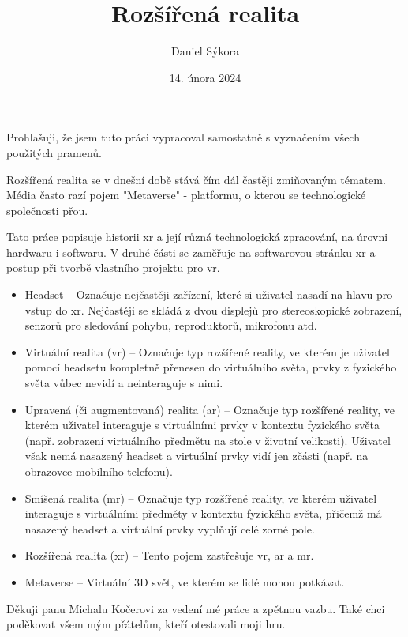 \documentclass[12pt]{report}
\author{Daniel Sýkora}
\title{Rozšířená realita}
\date{14. února 2024}
\begin{document}
\mytitlepage
\prohlaseni
{
	Prohlašuji, že jsem tuto práci vypracoval samostatně s vyznačením všech použitých pramenů.
}
\abstrakt
{ %
	Rozšířená realita se v dnešní době stává čím dál častěji zmiňovaným tématem. Média často razí pojem "Metaverse" - platformu, o kterou se technologické společnosti přou.

	Tato práce popisuje historii \gls{xr} a její různá technologická zpracování, na úrovni hardwaru i softwaru. V druhé části se zaměřuje na softwarovou stránku \gls{xr} a postup při tvorbě vlastního projektu pro \gls{vr}.
}
{ %
	\begin{itemize}
		\item Headset -- Označuje nejčastěji zařízení, které si uživatel nasadí na hlavu pro vstup do \gls{xr}.
				Nejčastěji se skládá z dvou displejů pro stereoskopické zobrazení, senzorů pro sledování pohybu,
				reproduktorů, mikrofonu atd.

		\item Virtuální realita (\gls{vr}) -- Označuje typ rozšířené reality, ve kterém je uživatel pomocí headsetu
				kompletně přenesen do virtuálního světa, prvky z fyzického světa vůbec nevidí a neinteraguje s nimi.

		\item Upravená (či augmentovaná) realita (\gls{ar}) -- Označuje typ rozšířené reality, ve kterém uživatel interaguje
				s virtuálními prvky v kontextu fyzického světa (např. zobrazení virtuálního předmětu na stole v životní velikosti).
				Uživatel však nemá nasazený headset a virtuální prvky vidí jen zčásti (např. na obrazovce mobilního telefonu).

		\item Smíšená realita (\gls{mr}) -- Označuje typ rozšířené reality, ve kterém uživatel interaguje s virtuálními předměty
				v kontextu fyzického světa, přičemž má nasazený headset a virtuální prvky vyplňují celé zorné pole.

		\item Rozšířená realita (\gls{xr}) -- Tento pojem zastřešuje \gls{vr}, \gls{ar} a \gls{mr}. \cite{xr_disambiguation}
		
		\item Metaverse -- Virtuální 3D svět, ve kterém se lidé mohou potkávat.
	\end{itemize}
}
\podekovani
{
	Děkuji panu Michalu Kočerovi za vedení mé práce a zpětnou vazbu. Také chci poděkovat všem mým přátelům, kteří otestovali moji hru.
}

\tableofcontents
\newpage






\nocite{*}

\appendix
{}

\printbibliography
{}

\printglossary[title={Zkratky}]

\listoffigures
{}
\end{document}
